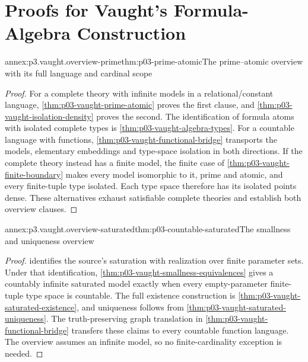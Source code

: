 \chapter{Proofs for Vaught's Formula-Algebra Construction}
\label{annex:p03-n-a-003-01}

\begin{annexitem}{annex:p3.vaught.overview-prime}{thm:p03-prime-atomic}{The prime--atomic overview with its full language and cardinal scope}
\begin{proof}
For a complete theory with infinite models in a relational/constant
language, \cref{thm:p03-vaught-prime-atomic} proves the first clause,
and \cref{thm:p03-vaught-isolation-density} proves the second.
The identification of formula atoms with isolated complete types is
\cref{thm:p03-vaught-algebra-types}. For a countable language with
functions, \cref{thm:p03-vaught-functional-bridge} transports the
models, elementary embeddings and type-space isolation in both directions.
If the complete theory instead has a finite model, the finite case of
\cref{thm:p03-vaught-finite-boundary} makes every model isomorphic to it,
prime and atomic, and every finite-tuple type isolated. Each type space
therefore has its isolated points dense. These alternatives exhaust
satisfiable complete theories and establish both overview clauses.
\end{proof}
\end{annexitem}

\begin{annexitem}{annex:p3.vaught.overview-saturated}{thm:p03-countable-saturated}{The smallness and uniqueness overview}
\begin{proof}
 identifies the source's
saturation with realization over finite parameter sets. Under that
identification, \cref{thm:p03-vaught-smallness-equivalences} gives a
countably infinite saturated model exactly when every empty-parameter
finite-tuple type space is countable. The full existence construction is
\cref{thm:p03-vaught-saturated-existence}, and uniqueness follows from
\cref{thm:p03-vaught-saturated-uniqueness}. The truth-preserving graph
translation in \cref{thm:p03-vaught-functional-bridge} transfers these
claims to every countable function language. The overview assumes an
infinite model, so no finite-cardinality exception is needed.
\end{proof}
\end{annexitem}

